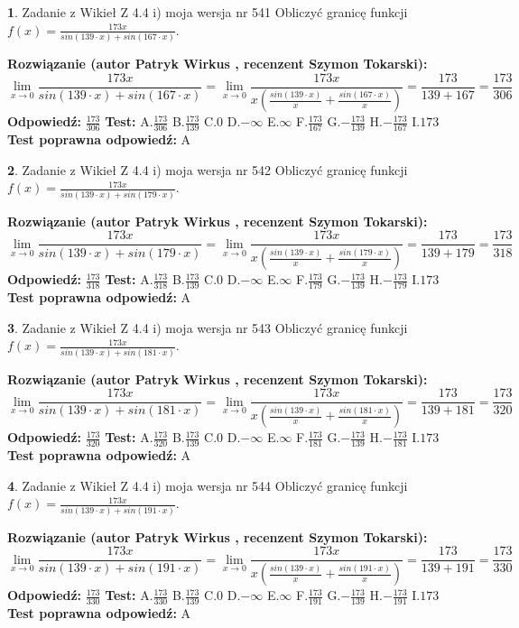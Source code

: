 \documentclass[12pt, a4paper]{article}
\theoremstyle{definition} %
\newtheorem{zad}{}
\newcommand{\zadStart}[1]{\begin{zad}#1\newline}
\newcommand{\zadStop}{\end{zad}}
\newcommand{\rozwStart}[2]{\noindent \textbf{Rozwiązanie (autor #1 , recenzent #2): }\newline}
\newcommand{\rozwStop}{\newline}
\newcommand{\odpStart}{\noindent \textbf{Odpowiedź:}\newline}
\newcommand{\odpStop}{\newline}
\newcommand{\testStart}{\noindent \textbf{Test:}\newline}
\newcommand{\testStop}{\newline}
\newcommand{\kluczStart}{\noindent \textbf{Test poprawna odpowiedź:}\newline}
\newcommand{\kluczStop}{\newline}
\begin{document}
\zadStart{Zadanie z Wikieł Z 4.4 i) moja wersja nr 541}
Obliczyć granicę funkcji $f(x)=\frac{173x}{sin(139\cdot x) +sin(167\cdot x)}$.
\zadStop
\rozwStart{Patryk Wirkus}{Szymon Tokarski}
$$\lim\limits_{x\to 0}\frac{173x}{sin(139\cdot x) +sin(167\cdot x)}=\lim\limits_{x\to 0}\frac{173x}{x(\frac{sin(139\cdot x)}{x}+\frac{sin(167\cdot x)}{x})}=\frac{173}{139+167} = \frac{173}{306}$$
\rozwStop
\odpStart
$\frac{173}{306}$
\odpStop
\testStart
A.$\frac{173}{306}$
B.$\frac{173}{139}$
C.$0$
D.$-\infty$
E.$\infty$
F.$\frac{173}{167}$
G.$-\frac{173}{139}$
H.$-\frac{173}{167}$
I.$173$
\testStop
\kluczStart
A
\kluczStop



\zadStart{Zadanie z Wikieł Z 4.4 i) moja wersja nr 542}
Obliczyć granicę funkcji $f(x)=\frac{173x}{sin(139\cdot x) +sin(179\cdot x)}$.
\zadStop
\rozwStart{Patryk Wirkus}{Szymon Tokarski}
$$\lim\limits_{x\to 0}\frac{173x}{sin(139\cdot x) +sin(179\cdot x)}=\lim\limits_{x\to 0}\frac{173x}{x(\frac{sin(139\cdot x)}{x}+\frac{sin(179\cdot x)}{x})}=\frac{173}{139+179} = \frac{173}{318}$$
\rozwStop
\odpStart
$\frac{173}{318}$
\odpStop
\testStart
A.$\frac{173}{318}$
B.$\frac{173}{139}$
C.$0$
D.$-\infty$
E.$\infty$
F.$\frac{173}{179}$
G.$-\frac{173}{139}$
H.$-\frac{173}{179}$
I.$173$
\testStop
\kluczStart
A
\kluczStop



\zadStart{Zadanie z Wikieł Z 4.4 i) moja wersja nr 543}
Obliczyć granicę funkcji $f(x)=\frac{173x}{sin(139\cdot x) +sin(181\cdot x)}$.
\zadStop
\rozwStart{Patryk Wirkus}{Szymon Tokarski}
$$\lim\limits_{x\to 0}\frac{173x}{sin(139\cdot x) +sin(181\cdot x)}=\lim\limits_{x\to 0}\frac{173x}{x(\frac{sin(139\cdot x)}{x}+\frac{sin(181\cdot x)}{x})}=\frac{173}{139+181} = \frac{173}{320}$$
\rozwStop
\odpStart
$\frac{173}{320}$
\odpStop
\testStart
A.$\frac{173}{320}$
B.$\frac{173}{139}$
C.$0$
D.$-\infty$
E.$\infty$
F.$\frac{173}{181}$
G.$-\frac{173}{139}$
H.$-\frac{173}{181}$
I.$173$
\testStop
\kluczStart
A
\kluczStop



\zadStart{Zadanie z Wikieł Z 4.4 i) moja wersja nr 544}
Obliczyć granicę funkcji $f(x)=\frac{173x}{sin(139\cdot x) +sin(191\cdot x)}$.
\zadStop
\rozwStart{Patryk Wirkus}{Szymon Tokarski}
$$\lim\limits_{x\to 0}\frac{173x}{sin(139\cdot x) +sin(191\cdot x)}=\lim\limits_{x\to 0}\frac{173x}{x(\frac{sin(139\cdot x)}{x}+\frac{sin(191\cdot x)}{x})}=\frac{173}{139+191} = \frac{173}{330}$$
\rozwStop
\odpStart
$\frac{173}{330}$
\odpStop
\testStart
A.$\frac{173}{330}$
B.$\frac{173}{139}$
C.$0$
D.$-\infty$
E.$\infty$
F.$\frac{173}{191}$
G.$-\frac{173}{139}$
H.$-\frac{173}{191}$
I.$173$
\testStop
\kluczStart
A
\kluczStop
\end{document}
